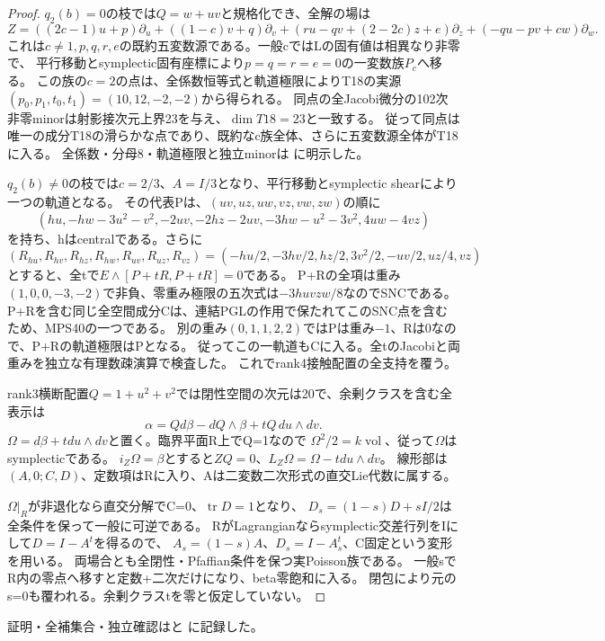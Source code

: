 \documentclass[a4paper,11pt]{ltjsarticle}
\theoremstyle{definition}
\begin{document}
\begin{proof}
$q_2(b)=0$の枝では$Q=w+uv$と規格化でき、全解の場は
\[
 Z=((2c-1)u+p)\partial_u+((1-c)v+q)\partial_v
 +(ru-qv+(2-2c)z+e)\partial_z+(-qu-pv+cw)\partial_w.
\]
これは$c\ne1,p,q,r,e$の既約五変数源である。一般cではLの固有値は相異なり非零で、
平行移動とsymplectic固有座標により$p=q=r=e=0$の一変数族$P_c$へ移る。
この族の$c=2$の点は、全係数恒等式と軌道極限によりT18の実源
$(p_0,p_1,t_0,t_1)=(10,12,-2,-2)$から得られる。
同点の全Jacobi微分の102次非零minorは射影接次元上界23を与え、$\dim T18=23$と一致する。
従って同点は唯一の成分T18の滑らかな点であり、既約なc族全体、さらに五変数源全体がT18に入る。
全係数・分母8・軌道極限と独立minorは
に明示した。

$q_2(b)\ne0$の枝では$c=2/3$、$A=I/3$となり、平行移動とsymplectic shearにより一つの軌道となる。
その代表Pは、$(uv,uz,uw,vz,vw,zw)$の順に
\[
 (hu,-hw-3u^2-v^2,-2uv,-2hz-2uv,-3hw-u^2-3v^2,4uw-4vz)
\]
を持ち、hはcentralである。さらに
\[
 (R_{hu},R_{hv},R_{hz},R_{hw},R_{uv},R_{uz},R_{vz})
 =(-hu/2,-3hv/2,hz/2,3v^2/2,-uv/2,uz/4,vz)
\]
とすると、全tで$E\wedge[P+tR,P+tR]=0$である。
P+Rの全項は重み$(1,0,0,-3,-2)$で非負、零重み極限の五次式は$-3huvzw/8$なのでSNCである。
P+Rを含む同じ全空間成分Cは、連結PGLの作用で保たれてこのSNC点を含むため、MPS40の一つである。
別の重み$(0,1,1,2,2)$ではPは重み$-1$、Rは0なので、P+Rの軌道極限はPとなる。
従ってこの一軌道もCに入る。全tのJacobiと両重みを独立な有理数疎演算で検査した。
これでrank4接触配置の全支持を覆う。

rank3横断配置$Q=1+u^2+v^2$では閉性空間の次元は20で、余剰クラスを含む全表示は
\[
 \alpha=Qd\beta-dQ\wedge\beta+tQ\,du\wedge dv.
\]
$\Omega=d\beta+tdu\wedge dv$と置く。臨界平面R上でQ=1なので
$\Omega^2/2=k\operatorname{vol}$、従って$\Omega$はsymplecticである。
$i_Z\Omega=\beta$とすると$ZQ=0$、$L_Z\Omega=\Omega-tdu\wedge dv$。
線形部は$(A,0;C,D)$、定数項はRに入り、Aは二変数二次形式の直交Lie代数に属する。

$\Omega|_R$が非退化なら直交分解でC=0、$\operatorname{tr}D=1$となり、
$D_s=(1-s)D+sI/2$は全条件を保って一般に可逆である。
RがLagrangianならsymplectic交差行列をIにして$D=I-A^t$を得るので、
$A_s=(1-s)A$、$D_s=I-A_s^t$、C固定という変形を用いる。
両場合とも全閉性・Pfaffian条件を保つ実Poisson族である。
一般sでR内の零点へ移すと定数+二次だけになり、beta零飽和に入る。
閉包により元のs=0も覆われる。余剰クラスtを零と仮定していない。
\end{proof}

証明・全補集合・独立確認はと
に記録した。
\end{document}
